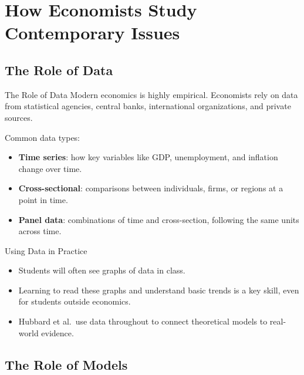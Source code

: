 \documentclass[aspectratio=169]{beamer}
\begin{document}
\section{How Economists Study Contemporary Issues}

\subsection{The Role of Data}

\begin{frame}{The Role of Data}
  \transfade
  Modern economics is highly empirical. Economists rely on data from statistical agencies,
  central banks, international organizations, and private sources.

  \vspace{0.2cm}
  Common data types:
  \begin{itemize}
    \item \textbf{Time series}: how key variables like GDP, unemployment, and inflation change over time.
    \item \textbf{Cross-sectional}: comparisons between individuals, firms, or regions at a point in time.
    \item \textbf{Panel data}: combinations of time and cross-section, following the same units across time.
  \end{itemize}
\end{frame}

\begin{frame}{Using Data in Practice}
  \transfade
  \begin{itemize}
    \item Students will often see graphs of data in class.
    \item Learning to read these graphs and understand basic trends is a key skill, even for
    students outside economics.
    \item Hubbard et al.\ use data throughout to connect theoretical models to real-world evidence.
  \end{itemize}
\end{frame}

\subsection{The Role of Models}
\end{document}
